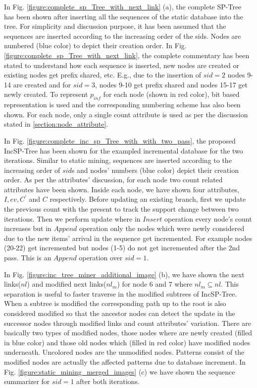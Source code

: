 In Fig. \ref{figure:complete_sp_Tree_with_next_link} (a), the complete SP-Tree has been shown after inserting all the sequences of the static database into the tree. For simplicity and discussion purpose, it has been assumed that the sequences are inserted according to the increasing order of the sids. Nodes are numbered (blue color) to depict their creation order. In Fig. \ref{figure:complete_sp_Tree_with_next_link}, the complete commentary has been stated to understand how each sequence is inserted, new nodes are created or existing nodes get prefix shared, etc. E.g., due to the insertion of $sid=2$ nodes 9-14 are created and for $sid=3$, nodes 9-10 get prefix shared and nodes 15-17 get newly created. To represent $p_{inf}$ for each node (shown in red color), bit based representation is used and the corresponding numbering scheme has also been shown. For each node, only a single count attribute is used as per the discussion stated in \ref{section:node_attribute}.


In Fig. \ref{figure:complete_inc_sp_Tree_with_with_two_pass}, the proposed IncSP-Tree has been shown for the exampled incremental database for the two iterations. Similar to static mining, sequences are inserted according to the increasing order of $sid$s and nodes' numbers (blue color) depict their creation order. As per the attributes' discussion, for each node two count related attributes have been shown. Inside each node, we have shown four attributes, $I,ev,C^{\prime}$ and $C$ respectively. Before updating an existing branch, first we update the previous count with the present to track the support change between two iterations. Then we perform update where in $Insert$ operation every node's count increases but in $Append$ operation only the nodes which were newly considered due to the new items' arrival in the sequence get incremented. For example nodes (20-22) get incremented but nodes (1-5) do not get incremented after the 2nd pass. This is an $Append$ operation over $sid=1$.

In Fig. \ref{figure:inc_tree_miner_additional_image} (b), we have shown the next links($nl$) and modified next links($nl_{m}$) for node $6$ and $7$ where $nl_{m} \subseteq nl$. This separation is useful to faster traverse in the modified subtrees of IncSP-Tree. When a subtree is modified the corresponding path up to the root is also considered modified so that the ancestor nodes can detect the update in the successor nodes through modified links and count attributes' variation. There are basically two types of modified nodes, those nodes where are newly created (filled in blue color) and those old nodes which (filled in red color) have modified nodes underneath. Uncolored nodes are the unmodified nodes. Patterns consist of the modified nodes are actually the affected patterns due to database increment. In Fig. \ref{figure:static_mining_merged_images} (c) we have shown the sequence summarizer for $sid=1$ after both iterations.


